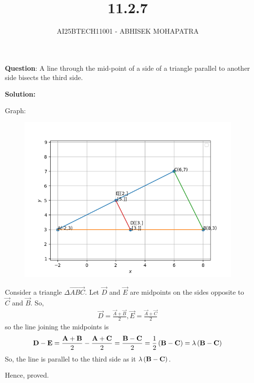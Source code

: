 \documentclass{beamer}
\title{11.2.7}
\author{AI25BTECH11001 - ABHISEK MOHAPATRA}
\numberwithin{equation}{section}
\begin{document}
{\let\newpage\relax\maketitle}
\renewcommand{\thefigure}{\theenumi}
\renewcommand{\thetable}{\theenumi}




	 	\textbf{Question}:
	A line through the mid-point of a side of a triangle parallel to another side bisects
the third side.	

		\textbf{Solution:}

	Graph:
\begin{figure}[h!]
	\centering
	\includegraphics[width=0.55\linewidth]{img.png}
\end{figure}


Consider a triangle $\Delta \vec{ABC}$.
Let $\vec{D}$ and $\vec{E}$ are midpoints on the sides opposite to $\vec{C}$ and $\vec{B}$.
So,
\begin{align}
		\vec{D} = \frac{\vec{A} +\vec{B}}{2}, 
		\vec{E} = \frac{\vec{A} +\vec{C}}{2}
\end{align}
so the line joining the midpoints is
\begin{align}
		\mathbf{D} - \mathbf{E} =\frac{\mathbf{A} +\mathbf{B}}{2}-\frac{\mathbf{A} +\mathbf{C}}{2}
		=\frac{\mathbf{B} -\mathbf{C}}{2}
		=\frac{1}{2}\left(\mathbf{B} -\mathbf{C}\right)= \lambda\left(\mathbf{B} -\mathbf{C}\right)
\end{align}
So, the line is parallel to the third side as it $\lambda\left(\mathbf{B} -\mathbf{C}\right)$.

Hence, proved.
\end{document}
